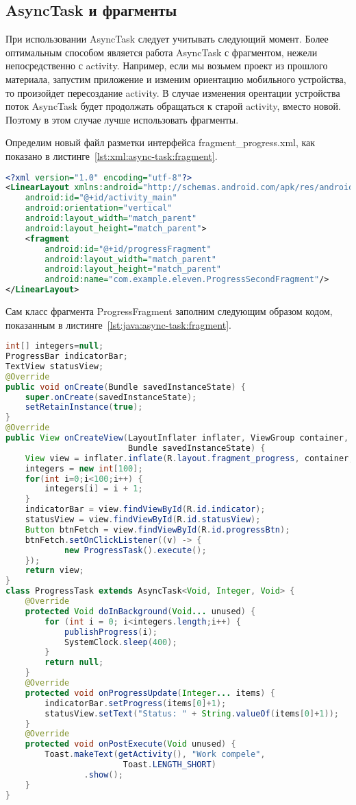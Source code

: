 \subsection{AsyncTask и фрагменты}
При использовании AsyncTask следует учитывать следующий момент. Более
оптимальным способом является работа AsyncTask с фрагментом, нежели
непосредственно с activity. Например, если мы возьмем проект из прошлого
материала, запустим приложение и изменим ориентацию мобильного
устройства, то произойдет пересоздание activity. В случае изменения
орентации устройства поток AsyncTask будет продолжать обращаться к
старой activity, вместо новой. Поэтому в этом случае лучше использовать
фрагменты.\par
Определим новый файл разметки интерфейса
fragment\_progress.xml, как показано
в листинге~\ref{lst:xml:async-task:fragment}.

\begin{lstlisting}[language=XML
	, label=lst:xml:async-task:fragment
	]
<?xml version="1.0" encoding="utf-8"?>
<LinearLayout xmlns:android="http://schemas.android.com/apk/res/android"
    android:id="@+id/activity_main"
    android:orientation="vertical"
    android:layout_width="match_parent"
    android:layout_height="match_parent">
    <fragment
        android:id="@+id/progressFragment"
        android:layout_width="match_parent"
        android:layout_height="match_parent"
        android:name="com.example.eleven.ProgressSecondFragment"/>
</LinearLayout>
\end{lstlisting}

Сам класс фрагмента ProgressFragment заполним следующим образом кодом,
показанным в листинге~\ref{lst:java:async-task:fragment}.

\begin{lstlisting}[language=Java
	, label=lst:java:async-task:fragment
	]
int[] integers=null;
ProgressBar indicatorBar;
TextView statusView;
@Override
public void onCreate(Bundle savedInstanceState) {
	super.onCreate(savedInstanceState);
	setRetainInstance(true);
}
@Override
public View onCreateView(LayoutInflater inflater, ViewGroup container,
						 Bundle savedInstanceState) {
	View view = inflater.inflate(R.layout.fragment_progress, container, false);
	integers = new int[100];
	for(int i=0;i<100;i++) {
		integers[i] = i + 1;
	}
	indicatorBar = view.findViewById(R.id.indicator);
	statusView = view.findViewById(R.id.statusView);
	Button btnFetch = view.findViewById(R.id.progressBtn);
	btnFetch.setOnClickListener((v) -> {
			new ProgressTask().execute();
	});
	return view;
}
class ProgressTask extends AsyncTask<Void, Integer, Void> {
	@Override
	protected Void doInBackground(Void... unused) {
		for (int i = 0; i<integers.length;i++) {
			publishProgress(i);
			SystemClock.sleep(400);
		}
		return null;
	}
	@Override
	protected void onProgressUpdate(Integer... items) {
		indicatorBar.setProgress(items[0]+1);
		statusView.setText("Status: " + String.valueOf(items[0]+1));
	}
	@Override
	protected void onPostExecute(Void unused) {
		Toast.makeText(getActivity(), "Work compele",
						Toast.LENGTH_SHORT)
				.show();
	}
}
\end{lstlisting}

